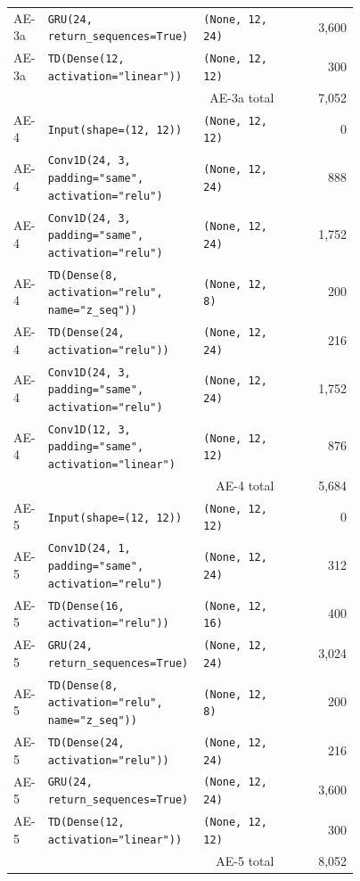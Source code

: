 \begin{longtable}{@{}p{0.08\linewidth}p{0.45\linewidth}p{0.24\linewidth}r@{}}
  AE-3a & \texttt{GRU(24, return\_sequences=True)} & \texttt{(None, 12, 24)} & 3,600 \\
  AE-3a & \texttt{TD(Dense(12, activation="linear"))} & \texttt{(None, 12, 12)} & 300 \\
  \multicolumn{3}{r}{AE-3a total} & 7,052 \\
  \midrule
  AE-4 & \texttt{Input(shape=(12, 12))} & \texttt{(None, 12, 12)} & 0 \\
  AE-4 & \texttt{Conv1D(24, 3, padding="same", activation="relu")} & \texttt{(None, 12, 24)} & 888 \\
  AE-4 & \texttt{Conv1D(24, 3, padding="same", activation="relu")} & \texttt{(None, 12, 24)} & 1,752 \\
  AE-4 & \texttt{TD(Dense(8, activation="relu", name="z\_seq"))} & \texttt{(None, 12, 8)} & 200 \\
  AE-4 & \texttt{TD(Dense(24, activation="relu"))} & \texttt{(None, 12, 24)} & 216 \\
  AE-4 & \texttt{Conv1D(24, 3, padding="same", activation="relu")} & \texttt{(None, 12, 24)} & 1,752 \\
  AE-4 & \texttt{Conv1D(12, 3, padding="same", activation="linear")} & \texttt{(None, 12, 12)} & 876 \\
  \multicolumn{3}{r}{AE-4 total} & 5,684 \\
  \midrule
  AE-5 & \texttt{Input(shape=(12, 12))} & \texttt{(None, 12, 12)} & 0 \\
  AE-5 & \texttt{Conv1D(24, 1, padding="same", activation="relu")} & \texttt{(None, 12, 24)} & 312 \\
  AE-5 & \texttt{TD(Dense(16, activation="relu"))} & \texttt{(None, 12, 16)} & 400 \\
  AE-5 & \texttt{GRU(24, return\_sequences=True)} & \texttt{(None, 12, 24)} & 3,024 \\
  AE-5 & \texttt{TD(Dense(8, activation="relu", name="z\_seq"))} & \texttt{(None, 12, 8)} & 200 \\
  AE-5 & \texttt{TD(Dense(24, activation="relu"))} & \texttt{(None, 12, 24)} & 216 \\
  AE-5 & \texttt{GRU(24, return\_sequences=True)} & \texttt{(None, 12, 24)} & 3,600 \\
  AE-5 & \texttt{TD(Dense(12, activation="linear"))} & \texttt{(None, 12, 12)} & 300 \\
  \multicolumn{3}{r}{AE-5 total} & 8,052 \\
\end{longtable}
\setlength{\tabcolsep}{6pt}
\normalsize

